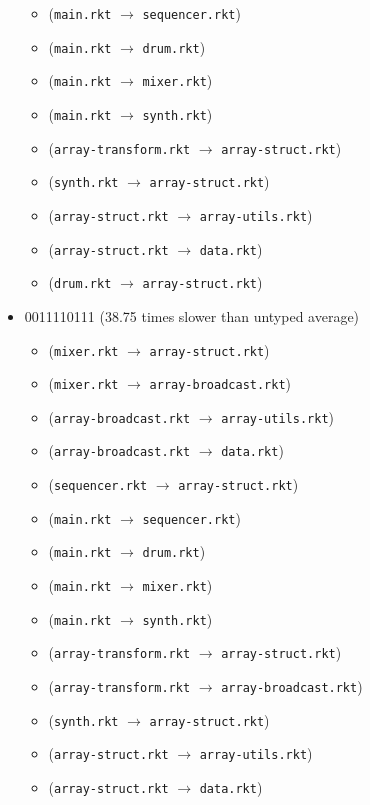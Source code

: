 \documentclass{article}
\newcommand{\mono}[1]{\texttt{#1}}
\begin{document}
\begin{itemize}
\begin{itemize}
  \item (\mono{main.rkt} $\rightarrow$ \mono{sequencer.rkt})
  \item (\mono{main.rkt} $\rightarrow$ \mono{drum.rkt})
  \item (\mono{main.rkt} $\rightarrow$ \mono{mixer.rkt})
  \item (\mono{main.rkt} $\rightarrow$ \mono{synth.rkt})
  \item (\mono{array-transform.rkt} $\rightarrow$ \mono{array-struct.rkt})
  \item (\mono{synth.rkt} $\rightarrow$ \mono{array-struct.rkt})
  \item (\mono{array-struct.rkt} $\rightarrow$ \mono{array-utils.rkt})
  \item (\mono{array-struct.rkt} $\rightarrow$ \mono{data.rkt})
  \item (\mono{drum.rkt} $\rightarrow$ \mono{array-struct.rkt})
  \end{itemize}
\item 0011110111 (38.75 times slower than untyped average)
  \begin{itemize}
  \item (\mono{mixer.rkt} $\rightarrow$ \mono{array-struct.rkt})
  \item (\mono{mixer.rkt} $\rightarrow$ \mono{array-broadcast.rkt})
  \item (\mono{array-broadcast.rkt} $\rightarrow$ \mono{array-utils.rkt})
  \item (\mono{array-broadcast.rkt} $\rightarrow$ \mono{data.rkt})
  \item (\mono{sequencer.rkt} $\rightarrow$ \mono{array-struct.rkt})
  \item (\mono{main.rkt} $\rightarrow$ \mono{sequencer.rkt})
  \item (\mono{main.rkt} $\rightarrow$ \mono{drum.rkt})
  \item (\mono{main.rkt} $\rightarrow$ \mono{mixer.rkt})
  \item (\mono{main.rkt} $\rightarrow$ \mono{synth.rkt})
  \item (\mono{array-transform.rkt} $\rightarrow$ \mono{array-struct.rkt})
  \item (\mono{array-transform.rkt} $\rightarrow$ \mono{array-broadcast.rkt})
  \item (\mono{synth.rkt} $\rightarrow$ \mono{array-struct.rkt})
  \item (\mono{array-struct.rkt} $\rightarrow$ \mono{array-utils.rkt})
  \item (\mono{array-struct.rkt} $\rightarrow$ \mono{data.rkt})

\end{itemize}
\end{itemize}
\end{document}
